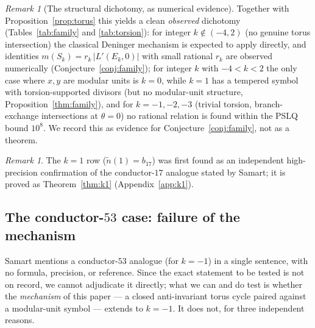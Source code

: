 \documentclass[11pt]{amsart}
\theoremstyle{definition}
\theoremstyle{remark}
\newtheorem{remark}[theorem]{Remark}
\begin{document}
\begin{remark}[The structural dichotomy, as numerical evidence]
Together with Proposition~\ref{prop:torus} this yields a clean
\emph{observed} dichotomy (Tables~\ref{tab:family} and
\ref{tab:torsion}): for integer $k\notin(-4,2)$ (no genuine torus
intersection) the classical Deninger mechanism is expected to apply
directly, and identities $m(S_k)=r_k\,|L'(E_k,0)|$ with small rational
$r_k$ are observed numerically (Conjecture~\ref{conj:family}); for integer
$k$ with $-4<k<2$ the only case where $x,y$ are modular units is $k=0$,
while $k=1$ has a tempered symbol with torsion-supported divisors (but no
modular-unit structure, Proposition~\ref{thm:family}), and for
$k=-1,-2,-3$ (trivial torsion,
branch-exchange intersections at $\theta=0$) no rational relation is found
within the PSLQ bound $10^8$. We record this as evidence for
Conjecture~\ref{conj:family}, not as a theorem.
\end{remark}

\begin{remark}
The $k=1$ row ($\tilde n(1)=b_{17}$) was first found as an independent
high-precision confirmation of the conductor-$17$ analogue stated by Samart;
it is proved as Theorem~\ref{thm:k1} (Appendix~\ref{app:k1}).
\end{remark}

\subsection{The conductor-\texorpdfstring{$53$}{53} case: failure of the
mechanism}
\label{subsec:k53}

Samart \cite[\S 4]{Samart2023} mentions a conductor-$53$ analogue (for
$k=-1$) in a single sentence, with no formula, precision, or reference.
Since the exact statement to be tested is not on record, we cannot
adjudicate it directly; what we can and do test is whether the
\emph{mechanism} of this paper --- a closed anti-invariant torus cycle
paired against a modular-unit symbol --- extends to $k=-1$. It does not,
for three independent reasons.
\end{document}
